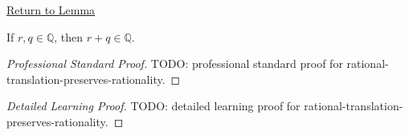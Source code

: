 \newpage
{}
\label{prf:rational-translation-preserves-rationality}

\begin{remark*}[Return]
\hyperref[lem:rational-translation-preserves-rationality]{Return to Lemma}
\end{remark*}

\begin{lemma*}
If $r,q\in\mathbb{Q}$, then $r+q\in\mathbb{Q}$.
\end{lemma*}

\begin{proof}[Professional Standard Proof]
\LRAProofBodyStart
TODO: professional standard proof for rational-translation-preserves-rationality.
\end{proof}

\begin{proof}[Detailed Learning Proof]
\LRAProofBodyStart
TODO: detailed learning proof for rational-translation-preserves-rationality.
\end{proof}

\begin{remark*}
\end{remark*}

\NoLocalDependencies

\clearpage

